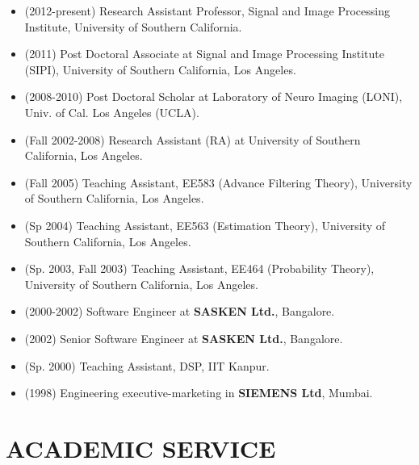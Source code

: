 \documentclass[overlapped,line,letterpaper]{res}
\begin{document}
\begin{resume}
\begin{itemize}
\item (2012-present) Research Assistant Professor, Signal and Image Processing Institute, University of Southern California. 
\item (2011) Post Doctoral Associate at Signal and Image Processing Institute (SIPI), University of Southern California, Los Angeles.
\item (2008-2010) Post Doctoral Scholar at Laboratory of Neuro Imaging (LONI), Univ. of Cal. Los Angeles (UCLA).
\item (Fall 2002-2008) Research Assistant (RA) at University of Southern California, Los Angeles.
\item (Fall 2005) Teaching Assistant, EE583 (Advance Filtering Theory), University of Southern California, Los Angeles.
\item (Sp 2004) Teaching Assistant, EE563 (Estimation Theory), University of Southern California, Los Angeles.
\item (Sp. 2003, Fall 2003) Teaching Assistant, EE464 (Probability Theory), University of Southern California, Los Angeles.
\item (2000-2002) Software Engineer at \textbf{SASKEN Ltd.}, Bangalore.
\item (2002) Senior Software Engineer at \textbf{SASKEN Ltd.}, Bangalore.
\item (Sp. 2000) Teaching Assistant, DSP, IIT Kanpur.
\item (1998) Engineering executive-marketing in \textbf{SIEMENS Ltd}, Mumbai.
\end{itemize}
\section{\bf ACADEMIC SERVICE}

\end{resume}
\end{document}
